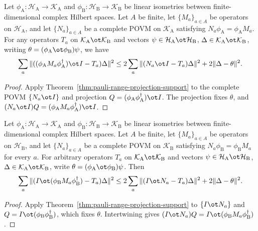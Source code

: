 \begin{theorem}
  \label{thm:pauli-isometry-transfer-alice-support}
  \leanok
  Let $\phi_{\mathrm A}\colon\mathcal H_{\mathrm A}\to\mathcal K_{\mathrm A}$
  and $\phi_{\mathrm B}\colon\mathcal H_{\mathrm B}\to\mathcal K_{\mathrm B}$
  be linear isometries between finite-dimensional complex Hilbert spaces.
  Let $A$ be finite, let $\{M_a\}_{a\in A}$ be operators on
  $\mathcal H_{\mathrm A}$, and let $\{N_a\}_{a\in A}$ be a complete POVM
  on $\mathcal K_{\mathrm A}$ satisfying $N_a\phi_{\mathrm A}=\phi_{\mathrm A}M_a$.
  For any operators $T_a$ on $\mathcal K_{\mathrm A}\ot\mathcal K_{\mathrm B}$
  and vectors $\psi\in\mathcal H_{\mathrm A}\ot\mathcal H_{\mathrm B}$,
  $\Delta\in\mathcal K_{\mathrm A}\ot\mathcal K_{\mathrm B}$, writing
  $\theta=(\phi_{\mathrm A}\ot\phi_{\mathrm B})\psi$, we have
  \[
    \sum_a\|((\phi_{\mathrm A}M_a\phi_{\mathrm A}^\dagger)\ot I-T_a)\Delta\|^2
    \le2\sum_a\|(N_a\ot I-T_a)\Delta\|^2+2\|\Delta-\theta\|^2.
  \]
\end{theorem}
\begin{proof}
  \leanok
  Apply Theorem~\ref{thm:pauli-range-projection-support} to the complete POVM
  $\{N_a\ot I\}$ and projection $Q=(\phi_{\mathrm A}\phi_{\mathrm A}^\dagger)\ot I$.
  The projection fixes $\theta$, and
  $(N_a\ot I)Q=(\phi_{\mathrm A}M_a\phi_{\mathrm A}^\dagger)\ot I$.
\end{proof}

\begin{theorem}
  \label{thm:pauli-isometry-transfer-bob-support}
  \leanok
  Let $\phi_{\mathrm A}\colon\mathcal H_{\mathrm A}\to\mathcal K_{\mathrm A}$
  and $\phi_{\mathrm B}\colon\mathcal H_{\mathrm B}\to\mathcal K_{\mathrm B}$
  be linear isometries between finite-dimensional complex Hilbert spaces.
  Let $A$ be finite, let $\{M_a\}_{a\in A}$ be operators on
  $\mathcal H_{\mathrm B}$, and let $\{N_a\}_{a\in A}$ be a complete POVM
  on $\mathcal K_{\mathrm B}$ satisfying
  $N_a\phi_{\mathrm B}=\phi_{\mathrm B}M_a$ for every $a$.
  For arbitrary operators $T_a$ on
  $\mathcal K_{\mathrm A}\ot\mathcal K_{\mathrm B}$ and vectors
  $\psi\in\mathcal H_{\mathrm A}\ot\mathcal H_{\mathrm B}$,
  $\Delta\in\mathcal K_{\mathrm A}\ot\mathcal K_{\mathrm B}$,
  write $\theta=(\phi_{\mathrm A}\ot\phi_{\mathrm B})\psi$. Then
  \[
    \sum_a\|(I\ot(\phi_{\mathrm B}M_a\phi_{\mathrm B}^\dagger)-T_a)\Delta\|^2
    \le2\sum_a\|(I\ot N_a-T_a)\Delta\|^2+2\|\Delta-\theta\|^2.
  \]
\end{theorem}
\begin{proof}
  \leanok
  Apply Theorem~\ref{thm:pauli-range-projection-support} to $\{I\ot N_a\}$ and
  $Q=I\ot(\phi_{\mathrm B}\phi_{\mathrm B}^\dagger)$, which fixes $\theta$.
  Intertwining gives $(I\ot N_a)Q=I\ot(\phi_{\mathrm B}M_a\phi_{\mathrm B}^\dagger)$.
\end{proof}

